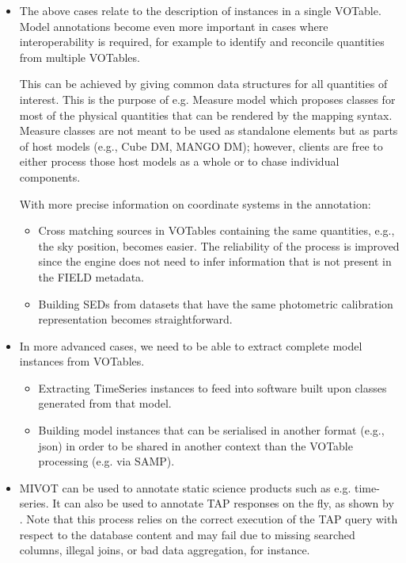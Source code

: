 \begin{itemize}
  \item The above cases relate to the description of instances in a
  single VOTable. Model annotations become even more important in cases
  where interoperability is required, for example to identify and
  reconcile quantities from multiple VOTables.

  This can be achieved by giving  common data structures for all 
  quantities of interest. This is the purpose of e.g. Measure model 
  which proposes classes for most of the physical quantities that can 
  be rendered by the mapping syntax. Measure classes are not meant to 
  be used as standalone elements but as parts of host models 
  (e.g., Cube DM, MANGO DM);
  however, clients are free to either process those host models as a
  whole or to chase individual components.
  
  With more precise information on coordinate systems in the annotation:
    \begin{itemize}
      \item Cross matching sources in VOTables containing the same
      quantities, e.g., the sky position, becomes easier.
            The reliability of the process is improved since the engine does not need to infer information that is not present in the FIELD metadata.
      \item Building SEDs from datasets that have the same photometric calibration representation becomes straightforward.
   \end{itemize}          

  \item In more advanced cases, we need to be able to extract complete model instances from VOTables.
    \begin{itemize}
      \item Extracting  TimeSeries instances to feed into software built upon classes generated from that model.
      \item Building model instances that can be serialised in another
      format (e.g., json) in order to be shared in another context than 
            the VOTable processing (e.g. via SAMP).
   \end{itemize}         
    
   \item MIVOT can be used to annotate static science products such as e.g. time-series. It can also be used to annotate 
    TAP responses on the fly, as shown by \cite{2201.01732}. Note that this process relies on the correct execution of the TAP query 
    with respect to the database content and may fail due to missing searched columns, illegal joins, or bad data aggregation, for instance. 
   
    
\end{itemize} 

